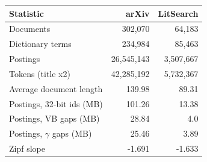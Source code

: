 \begin{tabular}{lrr}
\toprule
Statistic & arXiv & LitSearch \\
\midrule
Documents & 302,070 & 64,183 \\
Dictionary terms & 234,984 & 85,463 \\
Postings & 26,545,143 & 3,507,667 \\
Tokens (title x2) & 42,285,192 & 5,732,367 \\
Average document length & 139.98 & 89.31 \\
Postings, 32-bit ids (MB) & 101.26 & 13.38 \\
Postings, VB gaps (MB) & 28.84 & 4.0 \\
Postings, $\gamma$ gaps (MB) & 25.46 & 3.89 \\
Zipf slope & -1.691 & -1.633 \\
\bottomrule
\end{tabular}
